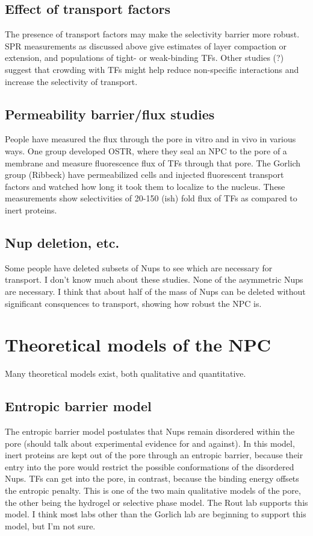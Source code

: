 \subsection{Effect of transport factors}
The presence of transport factors may make the selectivity barrier more robust.  SPR measurements as discussed above give estimates of layer compaction or extension, and populations of tight- or weak-binding TFs.  Other studies (?) suggest that crowding with TFs might help reduce non-specific interactions and increase the selectivity of transport.
\subsection{Permeability barrier/flux studies}
People have measured the flux through the pore in vitro and in vivo in various ways.  One group developed OSTR, where they seal an NPC to the pore of a membrane and measure fluorescence flux of TFs through that pore.  The Gorlich group (Ribbeck) have permeabilized cells and injected fluorescent transport factors and watched how long it took them to localize to the nucleus.  These measurements show selectivities of 20-150 (ish) fold flux of TFs as compared to inert proteins.
\subsection{Nup deletion, etc.}
Some people have deleted subsets of Nups to see which are necessary for transport.  I don't know much about these studies.  None of the asymmetric Nups are necessary.  I think that about half of the mass of Nups can be deleted without significant consquences to transport, showing how robust the NPC is.
\section{Theoretical models of the NPC}
Many theoretical models exist, both qualitative and quantitative.
\subsection{Entropic barrier model}
The entropic barrier model postulates that Nups remain disordered within the pore (should talk about experimental evidence for and against).  In this model, inert proteins are kept out of the pore through an entropic barrier, because their entry into the pore would restrict the possible conformations of the disordered Nups.  TFs can get into the pore, in contrast, because the binding energy offsets the entropic penalty.  This is one of the two main qualitative models of the pore, the other being the hydrogel or selective phase model.  The Rout lab supports this model.  I think most labs other than the Gorlich lab are beginning to support this model, but I'm not sure.
